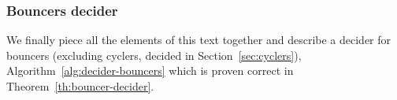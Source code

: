 



\subsubsection{Bouncers decider}

We finally piece all the elements of this text together and describe a decider for bouncers (excluding cyclers, decided in Section~\ref{sec:cyclers}), Algorithm~\ref{alg:decider-bouncers} which is proven correct in Theorem~\ref{th:bouncer-decider}.

